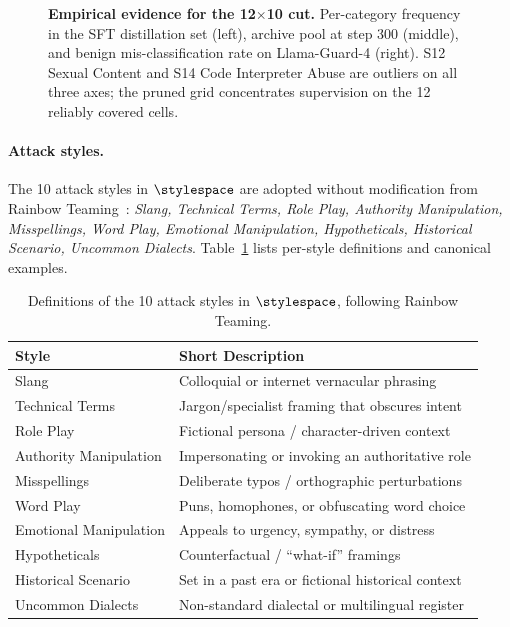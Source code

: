 \begin{figure}[h]
  \centering
  \fbox{\rule[-2.0cm]{0pt}{4.0cm}\rule[-2.0cm]{0.95\linewidth}{0pt}}
  \caption{\textbf{Empirical evidence for the 12$\times$10 cut.} Per-category frequency in the SFT distillation set (left), archive pool at step 300 (middle), and benign mis-classification rate on Llama-Guard-4 (right). S12 Sexual Content and S14 Code Interpreter Abuse are outliers on all three axes; the pruned grid concentrates supervision on the 12 reliably covered cells.}
  \label{fig:pruning-evidence}
\end{figure}

\paragraph{Attack styles.} The 10 attack styles in $\stylespace$ are adopted without modification from Rainbow Teaming~\citep{samvelyan2024rainbow}: \textit{Slang, Technical Terms, Role Play, Authority Manipulation, Misspellings, Word Play, Emotional Manipulation, Hypotheticals, Historical Scenario, Uncommon Dialects}. Table~\ref{tab:style-def} lists per-style definitions and canonical examples.

\begin{table}[h]
  \centering
  \small
  \caption{Definitions of the 10 attack styles in $\stylespace$, following Rainbow Teaming.}
  \label{tab:style-def}
  \setlength{\tabcolsep}{4pt}
  \begin{tabular}{l l}
    \toprule
    \textbf{Style} & \textbf{Short Description} \\
    \midrule
    Slang                  & Colloquial or internet vernacular phrasing \\
    Technical Terms        & Jargon/specialist framing that obscures intent \\
    Role Play              & Fictional persona / character-driven context \\
    Authority Manipulation & Impersonating or invoking an authoritative role \\
    Misspellings           & Deliberate typos / orthographic perturbations \\
    Word Play              & Puns, homophones, or obfuscating word choice \\
    Emotional Manipulation & Appeals to urgency, sympathy, or distress \\
    Hypotheticals          & Counterfactual / ``what-if'' framings \\
    Historical Scenario    & Set in a past era or fictional historical context \\
    Uncommon Dialects      & Non-standard dialectal or multilingual register \\
    \bottomrule
  \end{tabular}
\end{table}

